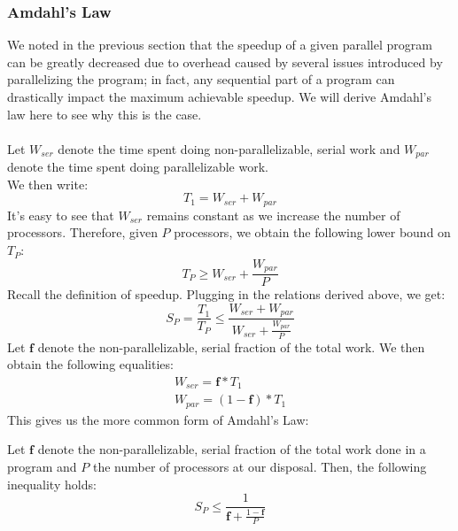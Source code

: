 \documentclass[main.tex]{subfiles}
\begin{document}

\subsubsection{Amdahl's Law} \label{Amdahl's Law}
We noted in the previous section that the speedup of a given parallel program can be greatly decreased due to overhead caused by several issues introduced by parallelizing the program; in fact, any sequential part of a program can drastically impact the maximum achievable speedup. We will derive Amdahl's law here to see why this is the case.\\
\\
Let $W_{ser}$ denote the time spent doing non-parallelizable, serial work and $W_{par}$ denote the time spent doing parallelizable work.\\
We then write:
\begin{equation*}
    T_1 = W_{ser} + W_{par}
\end{equation*}
It's easy to see that $W_{ser}$ remains constant as we increase the number of processors. Therefore, given $P$ processors, we obtain the following lower bound on $T_P$:
\begin{equation*}
    T_P \geq W_{ser} + \frac{W_{par}}{P}
\end{equation*}
Recall the definition of speedup. Plugging in the relations derived above, we get:
\begin{equation*}
    S_P = \frac{T_1}{T_P} \leq \frac{W_{ser} + W_{par}}{W_{ser} + \frac{W_{par}}{P}}
\end{equation*}
Let $\mathbf{f}$ denote the non-parallelizable, serial fraction of the total work. We then obtain the following equalities:
\begin{gather*}
    W_{ser} = \mathbf{f}*T_1 \\
    W_{par} = (1-\mathbf{f})*T_1
\end{gather*}
This gives us the more common form of Amdahl's Law:
\begin{theorem} 
    Let $\mathbf{f}$ denote the non-parallelizable, serial fraction of the total work done in a program and $P$ the number of processors at our disposal. Then, the following inequality holds:
    \begin{equation*}
        S_P \leq \frac{1}{\mathbf{f} + \frac{1-\mathbf{f}}{P}}
    \end{equation*}
\end{theorem}
\end{document}
